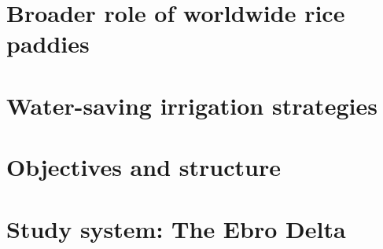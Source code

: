 

\section*{Broader role of worldwide rice paddies}



\section*{Water-saving irrigation strategies}

\section*{Objectives and structure}



\section*{Study system: The Ebro Delta}


